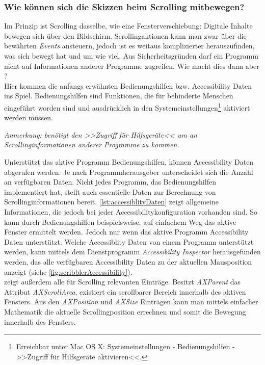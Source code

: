 \subsubsection* {Wie können sich die Skizzen beim Scrolling mitbewegen?}
Im Prinzip ist Scrolling dasselbe, wie eine Fensterverschiebung: Digitale Inhalte bewegen sich über den Bildschirm. Scrollingaktionen kann man zwar über die bewährten \emph{Events} ansteuern, jedoch ist es weitaus komplizierter herauszufinden, was sich bewegt hat und um wie viel. Aus Sicherheitsgründen darf ein Programm nicht auf Informationen anderer Programme zugreifen. Wie macht dies dann aber \scribbler?\\
Hier kommen die anfangs erwähnten Bedienungshilfen bzw. Accessibility Daten ins Spiel. Bedienungshilfen sind Funktionen, die für behinderte Menschen eingeführt worden sind und ausdrücklich in den Systemeinstellungen\footnote{Erreichbar unter Mac OS X: Systemeinstellungen - Bedienungshilfen - >>Zugriff für Hilfsgeräte aktivieren<<.} aktiviert werden müssen. 

\bigskip \emph{Anmerkung: \graffito{\(\clubsuit\)} \scribbler benötigt den >>Zugriff für Hilfsgeräte<< um an Scrollinginformationen anderer Programme zu kommen.}
\bigskip

Unterstützt das aktive Programm Bedienungshilfen, können Accessibility Daten abgerufen werden. Je nach Programmherausgeber unterscheidet sich die Anzahl an verfügbaren Daten. Nicht jedes Programm, das Bedienungshilfen implementiert hat, stellt auch essentielle Daten zur Berechnung von Scrollinginformationen bereit. \autoref{lst:accessiblityDaten} zeigt allgemeine Informationen, die jedoch bei jeder Accessibilitykonfiguration vorhanden sind. So kann durch Bedienungshilfen beispielsweise, auf einfachem Weg das aktive Fenster ermittelt werden. Jedoch nur wenn das aktive Programm Accessibility Daten unterstützt. Welche Accessiblity Daten von einem Programm unterstützt werden, kann mittels dem Dienstprogramm \emph{Accessibility Inspector} herausgefunden werden, das alle verfügbaren Accessibility Daten zu der aktuellen Mausposition anzeigt (siehe \autoref{fig:scribblerAccessibility}). \\
 zeigt außerdem alle für Scrolling relevanten Einträge. Besitzt \emph{AXParent} das Attribut \emph{AXScrollArea}, existiert ein scrollbarer Bereich innerhalb des aktiven Fensters. Aus den \emph{AXPosition} und \emph{AXSize} Einträgen kann man mittels einfacher Mathematik die aktuelle Scrollingposition errechnen und somit die Bewegung innerhalb des Fensters.

